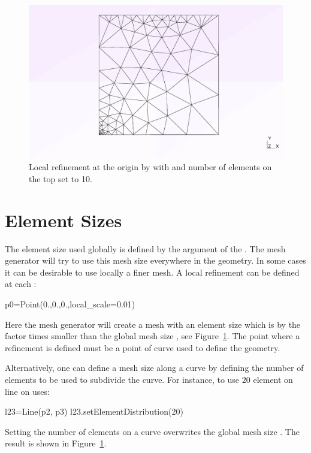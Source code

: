 \begin{figure}
\centerline{\includegraphics[width=\figwidth]{figures/refine1}}
\caption{Local refinement at the origin by
with  and number of elements on the top set to 10.}
\label{fig:PYCAD 5}
\end{figure}

\section{Element Sizes}
The element size used globally is defined by the 
 argument of the . The mesh generator 
will try to use this mesh size everywhere in the geometry. In some cases it can be 
desirable to use locally a finer mesh. A local refinement can be defined at each 
:
\begin{python}
p0=Point(0.,0.,0.,local_scale=0.01)
\end{python}
Here the mesh generator will create a mesh with an element size which is by the factor  
times smaller than the global mesh size , see Figure~\ref{fig:PYCAD 5}. The point where a refinement is defined must be a point of curve used to define the geometry. 

Alternatively, one can define a mesh size along a curve by defining the number of elements to be used to subdivide the curve. For instance, to use $20$ element on line  on uses:
\begin{python}
l23=Line(p2, p3)
l23.setElementDistribution(20)
\end{python}
Setting the number of elements on a curve overwrites the global mesh size . The result is shown in Figure~\ref{fig:PYCAD 5}. 



